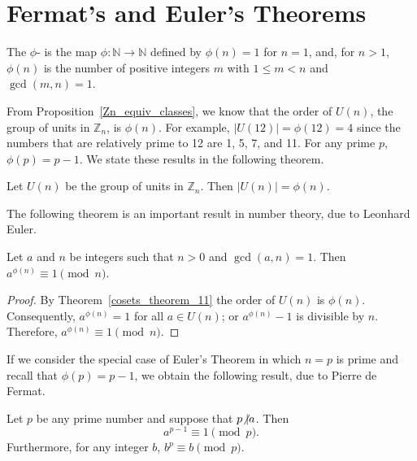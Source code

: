  

\section{Fermat's and Euler's Theorems}

The  $\phi$- is the map $\phi : {\mathbb N } \rightarrow {\mathbb N}$ defined by $\phi(n) = 1$ for $n=1$, and, for $n > 1$,  $\phi(n)$ is the number of positive integers $m$ with $1 \leq m < n$ and $\gcd(m,n) = 1$. 

From Proposition~\ref{Zn_equiv_classes}, we know that the order of $U(n)$, the group of units in ${\mathbb Z}_n$, is $\phi(n)$. For example, $|U(12)| = \phi(12)  = 4$ since the numbers that are relatively prime to 12 are 1, 5, 7, and 11. For any prime $p$, $\phi(p) = p-1$.  We state these results in the following theorem.

\begin{theorem}\label{cosets_theorem_11}
Let $U(n)$ be the group of units in ${\mathbb Z}_n$.  Then $|U(n)| = \phi(n)$.
\end{theorem}

The following theorem is an important result in number theory, due to Leonhard Euler. 

\begin{theorem}\label{cosets:Eulers_theorem}
Let $a$ and $n$ be integers such that $n > 0$ and $\gcd(a, n) = 1$.  Then $a^{\phi(n)} \equiv 1 \pmod{n}$.
\end{theorem}

\begin{proof}
By Theorem~\ref{cosets_theorem_11} the order of $U(n)$ is $\phi(n)$.  Consequently, $a^{\phi(n)} = 1$ for all $a \in U(n)$; or $a^{\phi(n)} - 1$ is divisible by $n$.  Therefore, $a^{\phi(n)} \equiv 1 \pmod{n}$.  
\hspace*{1in}
\end{proof}

\medskip

If we consider the special case of Euler's Theorem in which $n = p$ is prime and recall that $\phi(p) = p - 1$, we obtain the following result, due to Pierre de Fermat. 
 
\begin{theorem}\label{cosets_theorem_13}
Let $p$ be any prime number and suppose that $p {\not{\mid}} a$.  Then 
\[
a^{p-1} \equiv 1 \pmod{ p }.
\]
Furthermore, for any integer $b$, $b^p \equiv b \pmod{ p}$.
\end{theorem}

